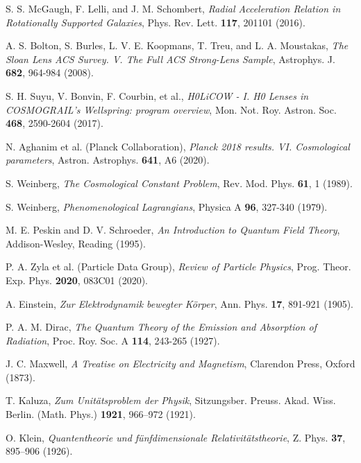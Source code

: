 \documentclass[12pt,a4paper]{article}
\begin{document}
\begin{thebibliography}{99}
		 S. S. McGaugh, F. Lelli, and J. M. Schombert, \textit{Radial Acceleration Relation in Rotationally Supported Galaxies}, Phys. Rev. Lett. \textbf{117}, 201101 (2016).
		
		 A. S. Bolton, S. Burles, L. V. E. Koopmans, T. Treu, and L. A. Moustakas, \textit{The Sloan Lens ACS Survey. V. The Full ACS Strong-Lens Sample}, Astrophys. J. \textbf{682}, 964-984 (2008).
		
		 S. H. Suyu, V. Bonvin, F. Courbin, et al., \textit{H0LiCOW - I. H0 Lenses in COSMOGRAIL's Wellspring: program overview}, Mon. Not. Roy. Astron. Soc. \textbf{468}, 2590-2604 (2017).
		
		 N. Aghanim et al. (Planck Collaboration), \textit{Planck 2018 results. VI. Cosmological parameters}, Astron. Astrophys. \textbf{641}, A6 (2020).
		
		 S. Weinberg, \textit{The Cosmological Constant Problem}, Rev. Mod. Phys. \textbf{61}, 1 (1989).
		
		 S. Weinberg, \textit{Phenomenological Lagrangians}, Physica A \textbf{96}, 327-340 (1979).
		
		 M. E. Peskin and D. V. Schroeder, \textit{An Introduction to Quantum Field Theory}, Addison-Wesley, Reading (1995).
		
		 P. A. Zyla et al. (Particle Data Group), \textit{Review of Particle Physics}, Prog. Theor. Exp. Phys. \textbf{2020}, 083C01 (2020).
		
		 A. Einstein, \textit{Zur Elektrodynamik bewegter Körper}, Ann. Phys. \textbf{17}, 891-921 (1905).
		
		 P. A. M. Dirac, \textit{The Quantum Theory of the Emission and Absorption of Radiation}, Proc. Roy. Soc. A \textbf{114}, 243-265 (1927).
		
		 J. C. Maxwell, \textit{A Treatise on Electricity and Magnetism}, Clarendon Press, Oxford (1873).
		
		 T. Kaluza, \textit{Zum Unitätsproblem der Physik}, Sitzungsber. Preuss. Akad. Wiss. Berlin. (Math. Phys.) \textbf{1921}, 966–972 (1921).
		
		 O. Klein, \textit{Quantentheorie und fünfdimensionale Relativitätstheorie}, Z. Phys. \textbf{37}, 895–906 (1926).
		

\end{thebibliography}
\end{document}
